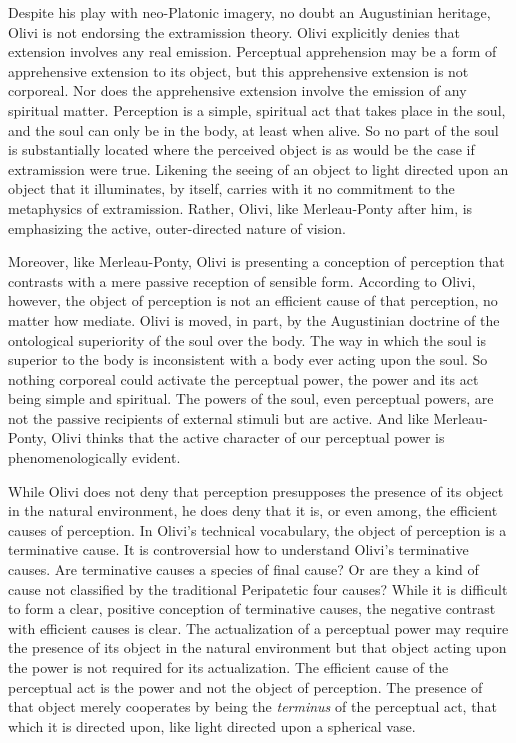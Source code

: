 \documentclass[12pt]{article}
\begin{document}
Despite his play with neo-Platonic imagery, no doubt an Augustinian heritage, Olivi is not endorsing the extramission theory. Olivi explicitly denies that extension involves any real emission. Perceptual apprehension may be a form of apprehensive extension to its object, but this apprehensive extension is not corporeal. Nor does the apprehensive extension involve the emission of any spiritual matter. Perception is a simple, spiritual act that takes place in the soul, and the soul can only be in the body, at least when alive. So no part of the soul is substantially located where the perceived object is as would be the case if extramission were true. Likening the seeing of an object to light directed upon an object that it illuminates, by itself, carries with it no commitment to the metaphysics of extramission. Rather, Olivi, like Merleau-Ponty after him, is emphasizing the active, outer-directed nature of vision.

Moreover, like Merleau-Ponty, Olivi is presenting a conception of perception that contrasts with a mere passive reception of sensible form. According to Olivi, however, the object of perception is not an efficient cause of that perception, no matter how mediate. Olivi is moved, in part, by the Augustinian doctrine of the ontological superiority of the soul over the body. The way in which the soul is superior to the body is inconsistent with a body ever acting upon the soul. So nothing corporeal could activate the perceptual power, the power and its act being simple and spiritual. The powers of the soul, even perceptual powers, are not the passive recipients of external stimuli but are active. And like Merleau-Ponty, Olivi thinks that the active character of our perceptual power is phenomenologically evident. 

While Olivi does not deny that perception presupposes the presence of its object in the natural environment, he does deny that it is, or even among, the efficient causes of perception. In Olivi's technical vocabulary, the object of perception is a terminative cause. It is controversial how to understand Olivi's terminative causes. Are terminative causes a species of final cause? Or are they a kind of cause not classified by the traditional Peripatetic four causes? While it is difficult to form a clear, positive conception of terminative causes, the negative contrast with efficient causes is clear. The actualization of a perceptual power may require the presence of its object in the natural environment but that object acting upon the power is not required for its actualization. The efficient cause of the perceptual act is the power and not the object of perception. The presence of that object merely cooperates by being the \emph{terminus} of the perceptual act, that which it is directed upon, like light directed upon a spherical vase.
\end{document}
